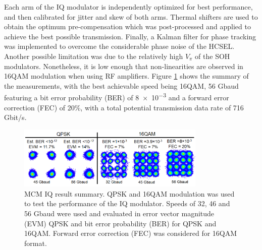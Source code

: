 Each arm of the IQ modulator is independently optimized for best performance, and then calibrated for jitter and skew of both arms. Thermal shifters are used to obtain the optimum pre-compensation which was post-processed and applied to achieve the best possible transmission. Finally, a Kalman filter for phase tracking was implemented to overcome the considerable phase noise of the HCSEL. Another possible limitation was due to the relatively high $V_\pi$ of the SOH modulators. Nonetheless, it is low enough that non-linearities are observed in 16QAM modulation when using RF amplifiers. Figure \ref{fig:mcm-005-DTE-res} shows the summary of the measurements, with the best achievable speed being 16QAM, 56 Gbaud featuring a bit error probability (BER) of \SI{8e-3}{} and a forward error correction (FEC) of 20\%, with a total potential transmission data rate of 716 Gbit/s.

\begin{figure}[!ht]
\centering
  \includegraphics[width=0.8\textwidth]{caps/IQ_56gb}
  \caption{MCM IQ result summary. QPSK and 16QAM modulation was used to test the performance of the IQ modulator. Speeds of 32, 46 and 56 Gbaud were used and evaluated in error vector magnitude (EVM) QPSK and bit error probability (BER) for QPSK and 16QAM. Forward error correction (FEC) was considered for 16QAM format.}
  \label{fig:mcm-005-DTE-res}
\end{figure}


